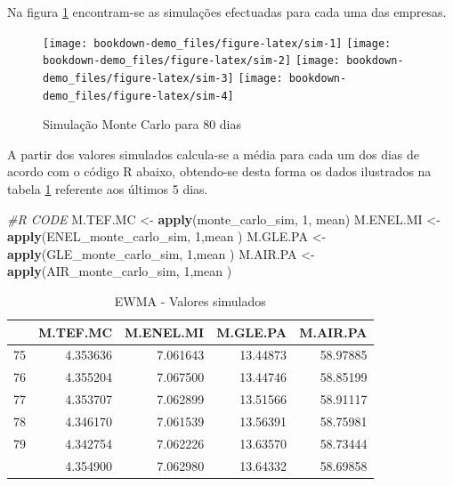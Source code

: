 \documentclass[
  12pt,
  a4paper,
  openany]{book}
\newenvironment{Shaded}{\begin{snugshade}}{\end{snugshade}}
\newcommand{\CommentTok}[1]{\textcolor[rgb]{0.56,0.35,0.01}{\textit{#1}}}
\newcommand{\DecValTok}[1]{\textcolor[rgb]{0.00,0.00,0.81}{#1}}
\newcommand{\KeywordTok}[1]{\textcolor[rgb]{0.13,0.29,0.53}{\textbf{#1}}}
\newcommand{\NormalTok}[1]{#1}
\newcommand{\StringTok}[1]{\textcolor[rgb]{0.31,0.60,0.02}{#1}}
\begin{document}
\normalsize

Na figura \ref{fig:sim} encontram-se as simulações efectuadas para cada uma das empresas.

\begin{figure}

{\centering \texttt{[image: bookdown-demo\_files/figure-latex/sim-1]} \texttt{[image: bookdown-demo\_files/figure-latex/sim-2]} \texttt{[image: bookdown-demo\_files/figure-latex/sim-3]} \texttt{[image: bookdown-demo\_files/figure-latex/sim-4]} 

}

\caption{Simulação Monte Carlo para 80 dias}\label{fig:sim}
\end{figure}

A partir dos valores simulados calcula-se a média para cada um dos dias de acordo com o código R abaixo, obtendo-se desta forma os dados ilustrados na tabela \ref{tab:simtabewma} referente aos últimos 5 dias.

\scriptsize

\begin{Shaded}
\begin{Highlighting}[]
\CommentTok{\#R CODE}
\NormalTok{M.TEF.MC \textless{}{-}}\StringTok{ }\KeywordTok{apply}\NormalTok{(monte\_carlo\_sim, }\DecValTok{1}\NormalTok{, mean)}
\NormalTok{M.ENEL.MI \textless{}{-}}\StringTok{ }\KeywordTok{apply}\NormalTok{(ENEL\_monte\_carlo\_sim, }\DecValTok{1}\NormalTok{,mean )}
\NormalTok{M.GLE.PA \textless{}{-}}\StringTok{ }\KeywordTok{apply}\NormalTok{(GLE\_monte\_carlo\_sim, }\DecValTok{1}\NormalTok{,mean )}
\NormalTok{M.AIR.PA \textless{}{-}}\StringTok{ }\KeywordTok{apply}\NormalTok{(AIR\_monte\_carlo\_sim, }\DecValTok{1}\NormalTok{,mean )}
\end{Highlighting}
\end{Shaded}

\normalsize

\begin{table}[!h]

\caption{\label{tab:simtabewma}EWMA - Valores simulados}
\centering
\begin{tabular}[t]{lrrrr}
\toprule
  & M.TEF.MC & M.ENEL.MI & M.GLE.PA & M.AIR.PA\\
\midrule
75 & 4.353636 & 7.061643 & 13.44873 & 58.97885\\
76 & 4.355204 & 7.067500 & 13.44746 & 58.85199\\
77 & 4.353707 & 7.062899 & 13.51566 & 58.91117\\
78 & 4.346170 & 7.061539 & 13.56391 & 58.75981\\
79 & 4.342754 & 7.062226 & 13.63570 & 58.73444\\
\addlinespace
80 & 4.354900 & 7.062980 & 13.64332 & 58.69858\\
\bottomrule
\end{tabular}
\end{table}
\FloatBarrier
\centering
\end{document}
